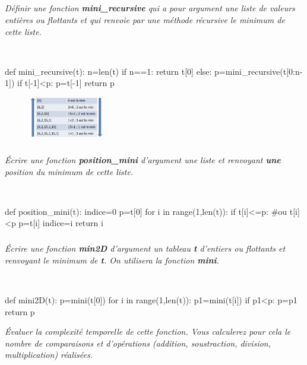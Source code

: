 \documentclass[10pt,fleqn]{article} %
\begin{document}
\subparagraph{}
\textit{Définir une fonction \textbf{mini\_recursive} qui a pour argument une liste de valeurs entières ou flottants et qui renvoie par une méthode récursive le \emph{minimum} de cette liste.}

\ifprof
\begin{corrige}~\
\begin{python}
def mini_recursive(t):
    n=len(t)
    if n==1:
        return t[0]
    else:
        p=mini_recursive(t[0:n-1])
        if t[-1]<p:
            p=t[-1]
        return p
\end{python}
\end{corrige}
\else
\fi

\begin{figure}[h]
	\centering
		\includegraphics[width=0.3\textwidth]{images/recursivite.png}
\end{figure}

  
 \subparagraph{}
\textit{ Écrire une fonction \textbf{position\_mini} d'argument une liste et renvoyant \textbf{une} position
  du minimum de cette liste.\\}
  
\ifprof
\begin{corrige}~\
\begin{python}
def position_mini(t):
    indice=0
    p=t[0]
    for i in range(1,len(t)):
        if t[i]<=p: #ou t[i]<p
            p=t[i]
            indice=i
    return i
\end{python}
\end{corrige}
\else
\fi

\subparagraph{}
\textit{Écrire une fonction \textbf{min2D} d'argument un tableau \textbf{t} d'entiers ou flottants 
et renvoyant le minimum de \textbf{t}. On utilisera la fonction \textbf{mini}.}

\ifprof
\begin{corrige}~\
\begin{python}
def mini2D(t):
    p=mini(t[0])
    for i in range(1,len(t)):
        p1=mini(t[i])
        if p1<p:
            p=p1
    return p
\end{python}
\end{corrige}
\else
\fi

\textit{Évaluer la complexité temporelle de cette fonction.
Vous calculerez pour cela le nombre de comparaisons et d'opérations (addition, soustraction, division, multiplication) réalisées.}
\end{document}
